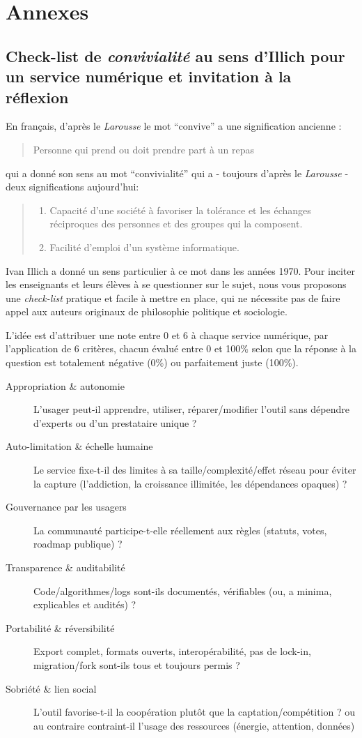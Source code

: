 \documentclass[11pt,a4paper]{article}
\begin{document}
\newpage
\section{Annexes}

\subsection{Check-list de \textit{convivialité} au sens d'Illich pour un service numérique et invitation à la réflexion}
En français, d'après le \textit{Larousse} le mot ``convive'' a une signification ancienne : \begin{quote}
    Personne qui prend ou doit prendre part à un repas
\end{quote} qui a donné son sens au mot ``convivialité'' qui a - toujours d'après le \textit{Larousse} - deux significations aujourd'hui: \begin{quote}
\begin{enumerate}
    \item Capacité d'une société à favoriser la tolérance et les échanges réciproques des personnes et des groupes qui la composent.
    \item Facilité d'emploi d'un système informatique.
\end{enumerate}
\end{quote}
Ivan Illich a donné un sens particulier à ce mot dans les années 1970. Pour inciter les enseignants et leurs élèves à se questionner sur le sujet, nous vous proposons une \textit{check-list} pratique et facile à mettre en place, qui ne nécessite pas de faire appel aux auteurs originaux de philosophie politique et sociologie.
\par L'idée est d'attribuer une note entre 0 et 6 à chaque service numérique, par l'application de 6 critères, chacun évalué entre 0 et 100\% selon que la réponse à la question est totalement négative (0\%) ou parfaitement juste (100\%).
\begin{description}
    \item[Appropriation \& autonomie] L'usager peut-il apprendre, utiliser, réparer/modifier l'outil sans dépendre d'experts ou d'un prestataire unique ?
    \item[Auto-limitation \& échelle humaine] Le service fixe-t-il des limites à sa taille/complexité/effet réseau pour éviter la capture (l'addiction, la croissance illimitée, les dépendances opaques) ?
    \item[Gouvernance par les usagers] La communauté participe-t-elle réellement aux règles (statuts, votes, roadmap publique) ?
    \item[Transparence \& auditabilité] Code/algorithmes/logs sont-ils documentés, vérifiables (ou, a minima, explicables et audités) ?
    \item[Portabilité \& réversibilité] Export complet, formats ouverts, interopérabilité, pas de lock-in, migration/fork sont-ils tous et toujours permis ?
    \item[Sobriété \& lien social] L'outil favorise-t-il la coopération plutôt que la captation/compétition ? ou au contraire contraint-il l'usage des ressources (énergie, attention, données)
\end{description}
\end{document}

